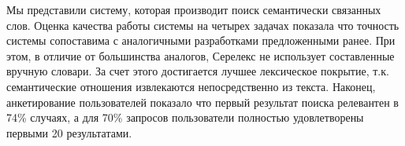 \documentclass[a4paper,10pt,twoside]{article}
\begin{document}
Мы представили систему, которая производит поиск семантически связанных слов. Оценка качества работы системы на четырех задачах показала что точность системы сопоставима с аналогичными разработками предложенными ранее. При этом, в отличие от большинства аналогов, Серелекс не использует составленные вручную словари. За счет этого достигается лучшее лексическое покрытие, т.к. семантические отношения извлекаются непосредственно из текста. Наконец, анкетирование пользователей показало что первый результат поиска релевантен в 74\% случаях, а для 70\% запросов пользователи полностью удовлетворены первыми 20 результатами.   



\end{document}
